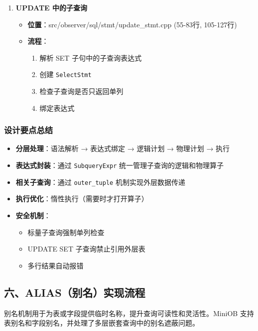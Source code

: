 \documentclass[a4paper, 12pt]{article}
\begin{document}
\begin{enumerate}
    \item \textbf{UPDATE 中的子查询}
    
\begin{itemize}
        \item \textbf{位置}：src/observer/sql/stmt/update\_stmt.cpp (55-83行, 105-127行)
        \item \textbf{流程}：
        \begin{enumerate}
            \item 解析 SET 子句中的子查询表达式
            \item 创建 \texttt{SelectStmt}
            \item 检查子查询是否只返回单列
            \item 绑定表达式
        \end{enumerate}
    \end{itemize}
\end{enumerate}

\subsubsection*{设计要点总结}
\begin{itemize}
    \item \textbf{分层处理}：语法解析 → 表达式绑定 → 逻辑计划 → 物理计划 → 执行
    \item \textbf{表达式封装}：通过 \texttt{SubqueryExpr} 统一管理子查询的逻辑和物理算子
    \item \textbf{相关子查询}：通过 \texttt{outer\_tuple} 机制实现外层数据传递
    \item \textbf{执行优化}：惰性执行（需要时才打开算子）
    \item \textbf{安全机制}：
    \begin{itemize}
        \item 标量子查询强制单列检查
        \item UPDATE SET 子查询禁止引用外层表
        \item 多行结果自动报错
    \end{itemize}
\end{itemize}

\subsection{六、ALIAS（别名）实现流程}
别名机制用于为表或字段提供临时名称，提升查询可读性和灵活性。MiniOB 支持表别名和字段别名，并处理了多层嵌套查询中的别名遮蔽问题。
\end{document}
